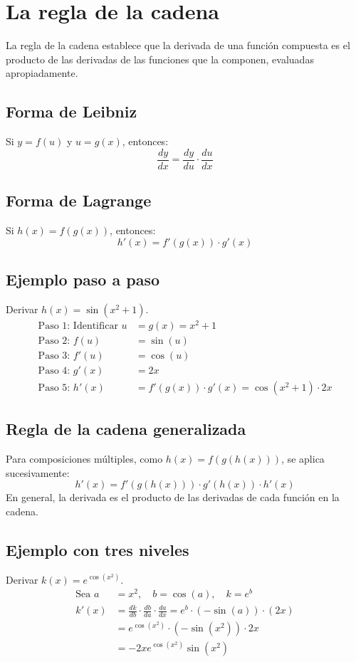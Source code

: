 \documentclass[12pt,a4paper,openany,oneside]{book}
\begin{document}
\section{La regla de la cadena}

La regla de la cadena establece que la derivada de una función compuesta es el producto de las derivadas de las funciones que la componen, evaluadas apropiadamente.

\subsection{Forma de Leibniz}
Si $y = f(u)$ y $u = g(x)$, entonces:
\[
\frac{dy}{dx} = \frac{dy}{du} \cdot \frac{du}{dx}
\]

\subsection{Forma de Lagrange}
Si $h(x) = f(g(x))$, entonces:
\[
h'(x) = f'(g(x)) \cdot g'(x)
\]

\subsection{Ejemplo paso a paso}
Derivar $h(x) = \sin(x^2 + 1)$.
\begin{align*}
\text{Paso 1: Identificar } u &= g(x) = x^2 + 1 \\
\text{Paso 2: } f(u) &= \sin(u) \\
\text{Paso 3: } f'(u) &= \cos(u) \\
\text{Paso 4: } g'(x) &= 2x \\
\text{Paso 5: } h'(x) &= f'(g(x)) \cdot g'(x) = \cos(x^2 + 1) \cdot 2x
\end{align*}

\subsection{Regla de la cadena generalizada}
Para composiciones múltiples, como $h(x) = f(g(h(x)))$, se aplica sucesivamente:
\[
h'(x) = f'(g(h(x))) \cdot g'(h(x)) \cdot h'(x)
\]
En general, la derivada es el producto de las derivadas de cada función en la cadena.

\subsection{Ejemplo con tres niveles}
Derivar $k(x) = e^{\cos(x^2)}$.
\begin{align*}
\text{Sea } a &= x^2, \quad b = \cos(a), \quad k = e^b \\
k'(x) &= \frac{dk}{db} \cdot \frac{db}{da} \cdot \frac{da}{dx} = e^b \cdot (-\sin(a)) \cdot (2x) \\
&= e^{\cos(x^2)} \cdot (-\sin(x^2)) \cdot 2x \\
&= -2x e^{\cos(x^2)} \sin(x^2)
\end{align*}
\end{document}
